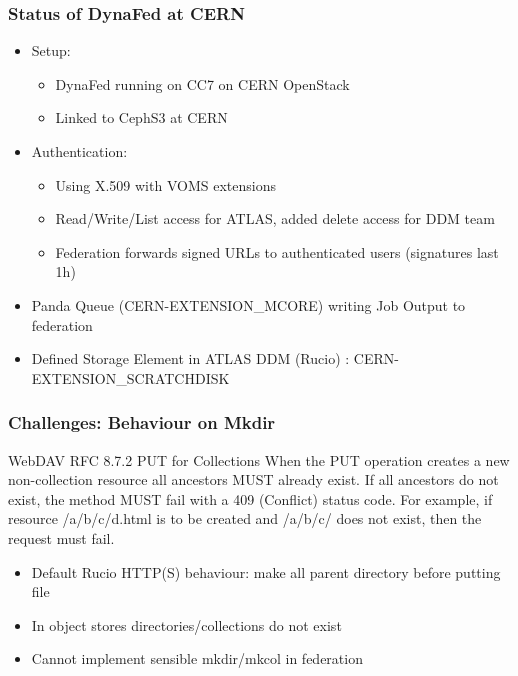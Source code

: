 \documentclass{beamer}
\begin{document}
\begin{frame}
  \frametitle{Status of DynaFed at CERN}
  \begin{itemize}
    \item Setup:
    \begin{itemize}
      \item DynaFed running on CC7 on CERN OpenStack
      \item Linked to CephS3 at CERN
    \end{itemize}
		\item Authentication:
    \begin{itemize}
      \item Using X.509 with VOMS extensions
      \item Read/Write/List access for ATLAS, added delete access for DDM team
      \item Federation forwards signed URLs to authenticated users (signatures last 1h)
    \end{itemize}
		\item Panda Queue (CERN-EXTENSION\_MCORE) writing Job Output to federation
		\item Defined Storage Element in ATLAS DDM (Rucio) : CERN-EXTENSION\_SCRATCHDISK
  \end{itemize}

\end{frame}

\begin{frame}
  \frametitle{Challenges: Behaviour on Mkdir}
  \begin{block}{WebDAV RFC 8.7.2 PUT for Collections}
    When the PUT operation creates a new non-collection resource all ancestors MUST already exist. If all ancestors do not exist, the method MUST fail with a 409 (Conflict) status code. For example, if resource /a/b/c/d.html is to be created and /a/b/c/ does not exist, then the request must fail.
  \end{block}
  \begin{itemize}
    \item<1- > Default Rucio HTTP(S) behaviour: make all parent directory before putting file
    \item<2- > In object stores directories/collections do not exist
    \item<2- > Cannot implement sensible mkdir/mkcol in federation
  \end{itemize}
\end{frame}
\end{document}
